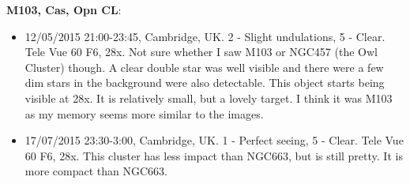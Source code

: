 {\bf M103, Cas, Opn CL}:
\begin{itemize}
\item 12/05/2015 21:00-23:45, Cambridge, UK. 2 - Slight undulations, 5 - Clear. Tele Vue 60 F6, 28x. Not sure whether I saw M103 or NGC457 (the Owl Cluster) though. A clear double star was well visible and there were a few dim stars in the background were also detectable. This object starts being visible at 28x. It is relatively small, but a lovely target. I think it was M103 as my memory seems more similar to the images.
\item 17/07/2015 23:30-3:00, Cambridge, UK. 1 - Perfect seeing, 5 - Clear. Tele Vue 60 F6, 28x. This cluster has less impact than NGC663, but is still pretty. It is more compact than NGC663.
\end{itemize}
